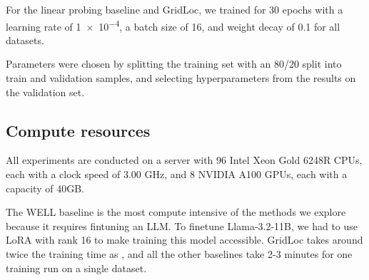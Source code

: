 For the linear probing baseline and GridLoc, we trained for 30 epochs with a learning rate of \num{1e-4}, a batch size of 16, and weight decay of 0.1 for all datasets.


Parameters were chosen by splitting the training set with an 80/20 split into train and validation samples, and selecting hyperparameters from the results on the validation set.

\subsection{Compute resources}
\label{app:compute}

All experiments are conducted on a server with 96 Intel Xeon Gold 6248R CPUs, each with a clock speed of 3.00 GHz, and 8 NVIDIA A100 GPUs, each with a capacity of 40GB.

The WELL baseline is the most compute intensive of the methods we explore because it requires fintuning an LLM.
To finetune Llama-3.2-11B, we had to use LoRA \citep{hu2021lora} with rank 16 to make training this model accessible. GridLoc takes around twice the training time as \ourmethod{}, and all the other baselines take 2-3 minutes for one training run on a single dataset.


